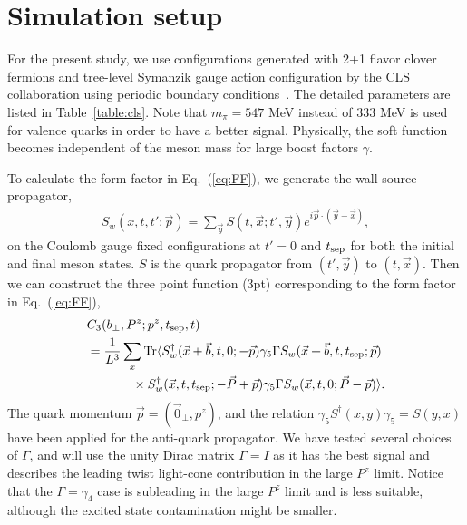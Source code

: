 \section{Simulation setup}
For the present study, we use configurations generated with   2+1 flavor clover fermions and tree-level Symanzik gauge action configuration by the CLS collaboration using periodic boundary conditions~\cite{Bruno:2014jqa}. The detailed parameters are listed in Table~\ref{table:cls}. Note that $m_\pi=547$ MeV instead of 333 MeV is used for valence quarks in order to have a better signal. Physically,  the soft function
becomes  independent of the meson mass for large boost factors $\gamma$.

To calculate the form factor in Eq.~(\ref{eq:FF}), we generate the wall source propagator,
\begin{align}
 S_w(x,t,t';\vec{p})=\sum_{\vec{y}} S(t,\vec{x};t',\vec{y})e^{i\vec{p}\cdot(\vec{y}-\vec{x})},
\end{align}
on the Coulomb gauge fixed configurations at $t'=0$ and $t_{\rm sep}$ for both the initial and final meson states.  $S$ is the quark propagator from $(t',\vec{y})$ to $(t,\vec{x})$. Then we can construct the three point function (3pt)
corresponding to the form factor in Eq.~(\ref{eq:FF}),
\begin{align}
&C_3(b_\perp,P^z;p^z,t_{\rm sep},t)\\
&=\frac{1}{L^3} \sum_x\textrm{Tr} \langle  S_{w}^\dagger(\vec{x}+\vec{b},t,0;-\vec{p})\gamma_5\Gamma S_{w}(\vec{x}+\vec{b},t,t_{\rm sep};\vec{p}) \nonumber\\
&\;\;\quad\quad \quad \times S_{w}^\dagger(\vec{x},t,t_{\rm sep};-\vec{P}+\vec{p}) \gamma_{5}\Gamma
 S_{w}(\vec{x},t,0;\vec{P}-\vec{p})\rangle\nonumber.
\end{align}
The quark momentum $\vec{p}=(\vec 0_{\perp},p^z)$, and
the relation $\gamma_5 S^{\dagger}(x,y)\gamma_5=S(y,x)$ have been applied for the anti-quark propagator. We have tested several choices of $\Gamma$, and will use the unity Dirac matrix  $\Gamma=I$ as it has the best signal and describes the leading twist light-cone contribution in the large $P^z$ limit. Notice that the $\Gamma=\gamma_4$ case  is   subleading in the large $P^z$ limit and is less suitable,   although  the excited state contamination might be smaller.

